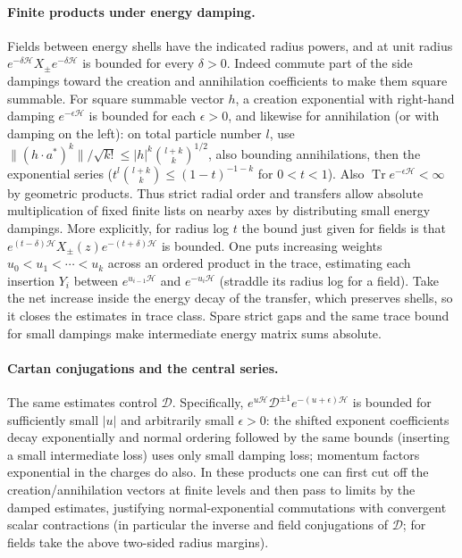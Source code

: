 \paragraph{Finite products under energy damping.}
Fields between energy shells have the indicated radius powers, and at unit radius \(e^{-\delta\mathcal H}X_\pm e^{-\delta\mathcal H}\) is bounded for every \(\delta>0\). Indeed commute part of the side dampings toward the creation and annihilation coefficients to make them square summable. For square summable vector \(h\), a creation exponential with right-hand damping \(e^{-\epsilon\mathcal H}\) is bounded for each \(\epsilon>0\), and likewise for annihilation (or with damping on the left): on total particle number \(l\), use \(\|(h\cdot a^*)^k\|/\sqrt{k!}\le |h|^k\binom{l+k}{k}^{1/2}\), also bounding annihilations, then the exponential series (\(t^l\binom{l+k}{k}\le(1-t)^{-1-k}\) for \(0<t<1\)). Also \(\operatorname{Tr} e^{-\epsilon\mathcal H}<\infty\) by geometric products. Thus strict radial order and transfers allow absolute multiplication of fixed finite lists on nearby axes by distributing small energy dampings. More explicitly, for radius log \(t\) the bound just given for fields is that
\(e^{(t-\delta)\mathcal H}X_\pm(z)e^{-(t+\delta)\mathcal H}\) is bounded. One puts increasing weights \(u_0< u_1<\cdots<u_k\) across an ordered product in the trace, estimating each insertion \(Y_i\) between \(e^{u_{i-1}\mathcal H}\) and \(e^{-u_i\mathcal H}\) (straddle its radius log for a field). Take the net increase inside the energy decay of the transfer, which preserves shells, so it closes the estimates in trace class. Spare strict gaps and the same trace bound for small dampings make intermediate energy matrix sums absolute.

\paragraph{Cartan conjugations and the central series.}
The same estimates control \(\mathcal D\).
Specifically, \(e^{u\mathcal H}\mathcal D^{\pm1}e^{-(u+\epsilon)\mathcal H}\) is bounded for sufficiently small \(|u|\) and arbitrarily small \(\epsilon>0\): the shifted exponent coefficients decay exponentially and normal ordering followed by the same bounds (inserting a small intermediate loss) uses only small damping loss; momentum factors exponential in the charges do also. In these products one can first cut off the creation/annihilation vectors at finite levels and then pass to limits by the damped estimates, justifying normal-exponential commutations with convergent scalar contractions (in particular the inverse and field conjugations of \(\mathcal D\); for fields take the above two-sided radius margins).

